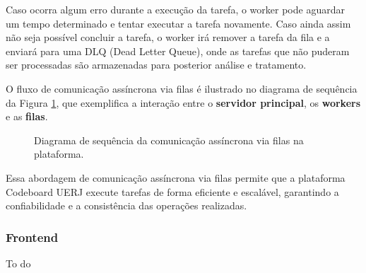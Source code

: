 Caso ocorra algum erro durante a execução da tarefa, o worker pode aguardar um tempo determinado e tentar executar a tarefa novamente. Caso ainda assim não seja possível concluir a tarefa, o worker irá remover a tarefa da fila e a enviará para uma DLQ (Dead Letter Queue), onde as tarefas que não puderam ser processadas são armazenadas para posterior análise e tratamento.

O fluxo de comunicação assíncrona via filas é ilustrado no diagrama de sequência da Figura \ref{fig:queue-flow}, que exemplifica a interação entre o \textbf{servidor principal}, os \textbf{workers} e as \textbf{filas}.

\begin{figure}[H] 
    \centering
    \caption{Diagrama de sequência da comunicação assíncrona via filas na plataforma.}
    \label{fig:queue-flow}
\end{figure}

Essa abordagem de comunicação assíncrona via filas permite que a plataforma Codeboard UERJ execute tarefas de forma eficiente e escalável, garantindo a confiabilidade e a consistência das operações realizadas.


\subsubsection{Frontend}

To do


